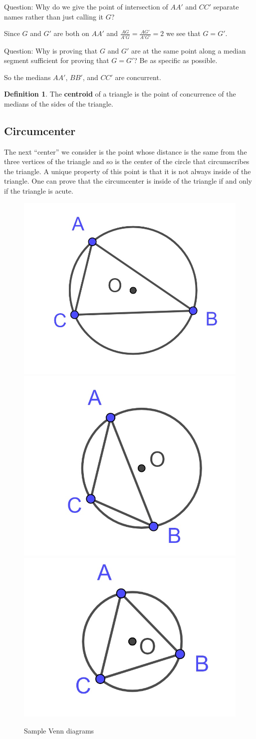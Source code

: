 \documentclass[
]{book}
\theoremstyle{definition}
\newtheorem{definition}{Definition}[chapter]
\theoremstyle{definition}
\theoremstyle{definition}
\theoremstyle{definition}
\theoremstyle{remark}
\begin{document}
Question: Why do we give the point of intersection of \(AA'\) and \(CC'\) separate names rather than just calling it \(G\)?

Since \(G\) and \(G'\) are both on \(AA'\) and \(\frac{AG}{A'G} = \frac{AG'}{A'G'} = 2\) we see that \(G=G'\).

Question: Why is proving that \(G\) and \(G'\) are at the same point along a median segment sufficient for proving that \(G=G'\)? Be as specific as possible.

So the medians \(AA'\), \(BB'\), and \(CC'\) are concurrent.

\begin{definition}
The \textbf{centroid} of a triangle is the point of concurrence of the medians of the sides of the triangle.
\end{definition}

\hypertarget{circumcenter}{%
\subsection{Circumcenter}\label{circumcenter}}

The next ``center'' we consider is the point whose distance is the same from the three vertices of the triangle and so is the center of the circle that circumscribes the triangle. A unique property of this point is that it is not always inside of the triangle. One can prove that the circumcenter is inside of the triangle if and only if the triangle is acute.

\begin{figure}

{\centering \includegraphics[width=0.3\linewidth]{images/circumcenter2} \includegraphics[width=0.3\linewidth]{images/circumcenter3} \includegraphics[width=0.3\linewidth]{images/circumcenter4} 

}

\caption{Sample Venn diagrams}\label{fig:unnamed-chunk-132}
\end{figure}
\end{document}
